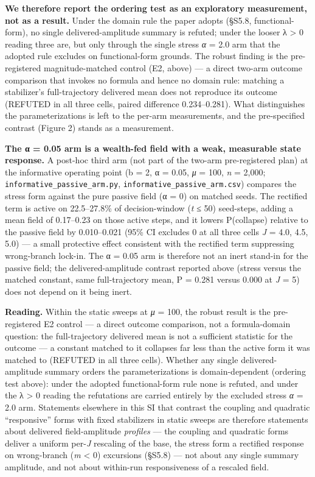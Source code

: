\documentclass[11pt,letterpaper]{article}
\newcounter{none}
\begin{document}
\textbf{We therefore report the ordering test as an exploratory measurement, not as a result.} Under the domain rule the paper adopts (§S5.8, functional-form), no single delivered-amplitude summary is refuted; under the looser λ \textgreater{} 0 reading three are, but only through the single stress \emph{α} = 2.0 arm that the adopted rule excludes on functional-form grounds. The robust finding is the pre-registered magnitude-matched control (E2, above) --- a direct two-arm outcome comparison that invokes no formula and hence no domain rule: matching a stabilizer's full-trajectory delivered mean does not reproduce its outcome (REFUTED in all three cells, paired difference 0.234--0.281). What distinguishes the parameterizations is left to the per-arm measurements, and the pre-specified contrast (Figure 2) stands as a measurement.

\textbf{The α = 0.05 arm is a wealth-fed field with a weak, measurable state response.} A post-hoc third arm (not part of the two-arm pre-registered plan) at the informative operating point (b = 2, α = 0.05, \emph{μ} = 100, \emph{n} = 2,000; \texttt{informative\_passive\_arm.py}, \texttt{informative\_passive\_arm.csv}) compares the stress form against the pure passive field (α = 0) on matched seeds. The rectified term is active on 22.5--27.8\% of decision-window (\emph{t} ≤ 50) seed-steps, adding a mean field of 0.17--0.23 on those active steps, and it lowers P(collapse) relative to the passive field by 0.010--0.021 (95\% CI excludes 0 at all three cells \emph{J} = 4.0, 4.5, 5.0) --- a small protective effect consistent with the rectified term suppressing wrong-branch lock-in. The α = 0.05 arm is therefore not an inert stand-in for the passive field; the delivered-amplitude contrast reported above (stress versus the matched constant, same full-trajectory mean, P = 0.281 versus 0.000 at \emph{J} = 5) does not depend on it being inert.

\textbf{Reading.} Within the static sweeps at \emph{μ} = 100, the robust result is the pre-registered E2 control --- a direct outcome comparison, not a formula-domain question: the full-trajectory delivered mean is not a sufficient statistic for the outcome --- a constant matched to it collapses far less than the active form it was matched to (REFUTED in all three cells). Whether any single delivered-amplitude summary orders the parameterizations is domain-dependent (ordering test above): under the adopted functional-form rule none is refuted, and under the λ \textgreater{} 0 reading the refutations are carried entirely by the excluded stress \emph{α} = 2.0 arm. Statements elsewhere in this SI that contrast the coupling and quadratic ``responsive'' forms with fixed stabilizers in static sweeps are therefore statements about delivered field-amplitude \emph{profiles} --- the coupling and quadratic forms deliver a uniform per-\emph{J} rescaling of the base, the stress form a rectified response on wrong-branch (\emph{m} \textless{} 0) excursions (§S5.8) --- not about any single summary amplitude, and not about within-run responsiveness of a rescaled field.
\end{document}
